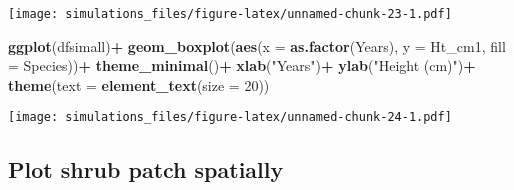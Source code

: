\documentclass[]{article}
\newenvironment{Shaded}{\begin{snugshade}}{\end{snugshade}}
\newcommand{\KeywordTok}[1]{\textcolor[rgb]{0.13,0.29,0.53}{\textbf{#1}}}
\newcommand{\DataTypeTok}[1]{\textcolor[rgb]{0.13,0.29,0.53}{#1}}
\newcommand{\DecValTok}[1]{\textcolor[rgb]{0.00,0.00,0.81}{#1}}
\newcommand{\StringTok}[1]{\textcolor[rgb]{0.31,0.60,0.02}{#1}}
\newcommand{\OperatorTok}[1]{\textcolor[rgb]{0.81,0.36,0.00}{\textbf{#1}}}
\newcommand{\NormalTok}[1]{#1}
\begin{document}
\texttt{[image: simulations\_files/figure-latex/unnamed-chunk-23-1.pdf]}

\begin{Shaded}
\begin{Highlighting}[]
\KeywordTok{ggplot}\NormalTok{(dfsimall)}\OperatorTok{+}
\StringTok{  }\KeywordTok{geom_boxplot}\NormalTok{(}\KeywordTok{aes}\NormalTok{(}\DataTypeTok{x =} \KeywordTok{as.factor}\NormalTok{(Years), }\DataTypeTok{y =}\NormalTok{ Ht_cm1, }\DataTypeTok{fill =}\NormalTok{ Species))}\OperatorTok{+}
\StringTok{  }\KeywordTok{theme_minimal}\NormalTok{()}\OperatorTok{+}
\StringTok{  }\KeywordTok{xlab}\NormalTok{(}\StringTok{"Years"}\NormalTok{)}\OperatorTok{+}
\StringTok{  }\KeywordTok{ylab}\NormalTok{(}\StringTok{"Height (cm)"}\NormalTok{)}\OperatorTok{+}
\StringTok{  }\KeywordTok{theme}\NormalTok{(}\DataTypeTok{text =} \KeywordTok{element_text}\NormalTok{(}\DataTypeTok{size =} \DecValTok{20}\NormalTok{))}
\end{Highlighting}
\end{Shaded}

\texttt{[image: simulations\_files/figure-latex/unnamed-chunk-24-1.pdf]}

\subsection{Plot shrub patch
spatially}\label{plot-shrub-patch-spatially}

\begin{Shaded}
\end{Shaded}
\end{document}
